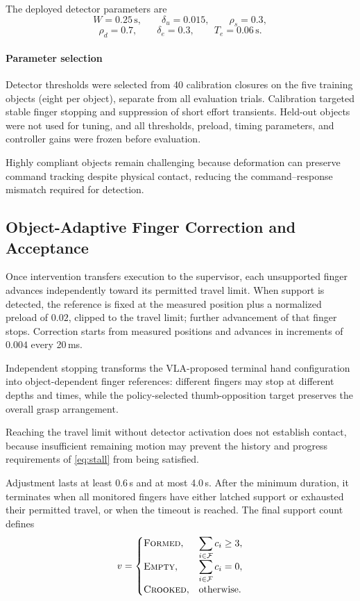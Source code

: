\documentclass[letterpaper,10pt,conference]{ieeeconf}
\newcommand{\formed}{\textsc{Formed}}
\newcommand{\crooked}{\textsc{Crooked}}
\newcommand{\emptygrasp}{\textsc{Empty}}
\begin{document}
The deployed detector parameters are
\[
W=0.25\,\mathrm{s},\qquad
\delta_u=0.015,\qquad
\rho_s=0.3,
\]
\[
\rho_d=0.7,\qquad
\delta_e=0.3,\qquad
T_e=0.06\,\mathrm{s}.
\]

\paragraph{Parameter selection}
Detector thresholds were selected from 40 calibration closures on the five
training objects (eight per object), separate from all evaluation trials.
Calibration targeted stable finger stopping and suppression of short effort
transients. Held-out objects were not used for tuning, and all thresholds,
preload, timing parameters, and controller gains were frozen before
evaluation.

Highly compliant objects remain challenging because deformation can preserve
command tracking despite physical contact, reducing the command--response
mismatch required for detection.

\subsection{Object-Adaptive Finger Correction and Acceptance}
\label{sec:correction}

Once intervention transfers execution to the supervisor, each unsupported
finger advances independently toward its permitted travel limit. When support
is detected, the reference is fixed at the measured position plus a normalized
preload of $0.02$, clipped to the travel limit; further advancement of that
finger stops. Correction starts from measured positions and advances in
increments of $0.004$ every 20\,ms.

Independent stopping transforms the VLA-proposed terminal hand configuration
into object-dependent finger references: different fingers may stop at
different depths and times, while the policy-selected thumb-opposition target
preserves the overall grasp arrangement.

Reaching the travel limit without detector activation does not establish
contact, because insufficient remaining motion may prevent the history and
progress requirements of \eqref{eq:stall} from being satisfied.

Adjustment lasts at least 0.6\,s and at most 4.0\,s. After the minimum
duration, it terminates when all monitored fingers have either latched support
or exhausted their permitted travel, or when the timeout is reached. The final
support count defines
\begin{equation}
v=
\begin{cases}
\formed,
& \displaystyle\sum_{i\in\mathcal{F}} c_i \geq 3,\\
\emptygrasp,
& \displaystyle\sum_{i\in\mathcal{F}} c_i = 0,\\
\crooked,
& \text{otherwise}.
\end{cases}
\label{eq:verdict}
\end{equation}
\end{document}

